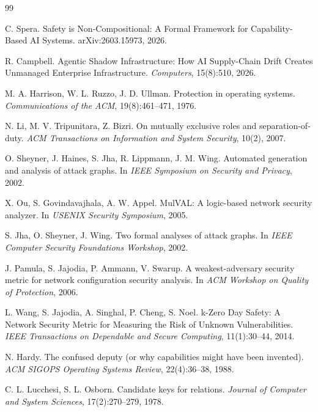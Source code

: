\documentclass[11pt]{article}
\begin{document}
\begin{thebibliography}{99}

C. Spera.
\newblock Safety is Non-Compositional: A Formal Framework for Capability-Based AI Systems.
\newblock arXiv:2603.15973, 2026.

R. Campbell.
\newblock Agentic Shadow Infrastructure: How AI Supply-Chain Drift Creates Unmanaged Enterprise Infrastructure.
\newblock \emph{Computers}, 15(8):510, 2026.

M. A. Harrison, W. L. Ruzzo, J. D. Ullman.
\newblock Protection in operating systems.
\newblock \emph{Communications of the ACM}, 19(8):461--471, 1976.

N. Li, M. V. Tripunitara, Z. Bizri.
\newblock On mutually exclusive roles and separation-of-duty.
\newblock \emph{ACM Transactions on Information and System Security}, 10(2), 2007.

O. Sheyner, J. Haines, S. Jha, R. Lippmann, J. M. Wing.
\newblock Automated generation and analysis of attack graphs.
\newblock In \emph{IEEE Symposium on Security and Privacy}, 2002.

X. Ou, S. Govindavajhala, A. W. Appel.
\newblock MulVAL: A logic-based network security analyzer.
\newblock In \emph{USENIX Security Symposium}, 2005.

S. Jha, O. Sheyner, J. Wing.
\newblock Two formal analyses of attack graphs.
\newblock In \emph{IEEE Computer Security Foundations Workshop}, 2002.

J. Pamula, S. Jajodia, P. Ammann, V. Swarup.
\newblock A weakest-adversary security metric for network configuration security analysis.
\newblock In \emph{ACM Workshop on Quality of Protection}, 2006.

L. Wang, S. Jajodia, A. Singhal, P. Cheng, S. Noel.
\newblock k-Zero Day Safety: A Network Security Metric for Measuring the Risk of Unknown Vulnerabilities.
\newblock \emph{IEEE Transactions on Dependable and Secure Computing}, 11(1):30--44, 2014.

N. Hardy.
\newblock The confused deputy (or why capabilities might have been invented).
\newblock \emph{ACM SIGOPS Operating Systems Review}, 22(4):36--38, 1988.

C. L. Lucchesi, S. L. Osborn.
\newblock Candidate keys for relations.
\newblock \emph{Journal of Computer and System Sciences}, 17(2):270--279, 1978.


\end{thebibliography}
\end{document}
